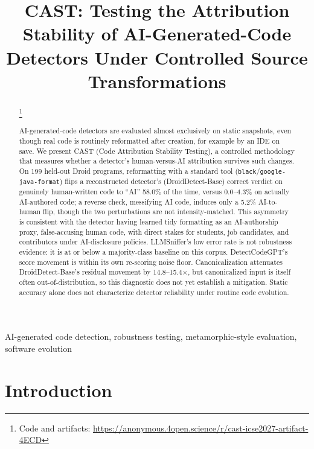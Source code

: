 \documentclass[10pt,conference]{IEEEtran}
\newcommand\blfootnote[1]{%
  \begingroup
  \renewcommand\thefootnote{}\footnote{\raggedright #1}%
  \addtocounter{footnote}{-1}%
  \endgroup
}
\begin{document}
\title{CAST: Testing the Attribution Stability of AI-Generated-Code Detectors Under Controlled Source Transformations}

\author{
}

\maketitle

\begin{abstract}
\blfootnote{Code and artifacts: \url{https://anonymous.4open.science/r/cast-icse2027-artifact-4ECD}}
AI-generated-code detectors are evaluated almost exclusively on static snapshots, even though real code is routinely reformatted after creation, for example by an IDE on save. We present CAST (Code Attribution Stability Testing), a controlled methodology that measures whether a detector's human-versus-AI attribution survives such changes. On 199 held-out Droid programs, reformatting with a standard tool (\texttt{black}/\texttt{google-java-format}) flips a reconstructed detector's (DroidDetect-Base) correct verdict on genuinely human-written code to ``AI'' 58.0\% of the time, versus 0.0--4.3\% on actually AI-authored code; a reverse check, messifying AI code, induces only a 5.2\% AI-to-human flip, though the two perturbations are not intensity-matched. This asymmetry is consistent with the detector having learned tidy formatting as an AI-authorship proxy, false-accusing human code, with direct stakes for students, job candidates, and contributors under AI-disclosure policies. LLMSniffer's low error rate is not robustness evidence: it is at or below a majority-class baseline on this corpus. DetectCodeGPT's score movement is within its own re-scoring noise floor. Canonicalization attenuates DroidDetect-Base's residual movement by 14.8--15.4$\times$, but canonicalized input is itself often out-of-distribution, so this diagnostic does not yet establish a mitigation. Static accuracy alone does not characterize detector reliability under routine code evolution.
\end{abstract}

\begin{IEEEkeywords}
AI-generated code detection, robustness testing, metamorphic-style evaluation, software evolution
\end{IEEEkeywords}

\section{Introduction}
\end{document}
